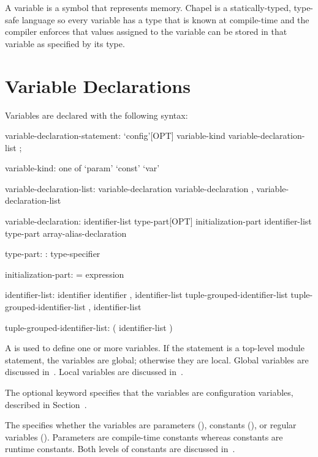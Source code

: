 \label{Variables}

A variable is a symbol that represents memory.  Chapel is a
statically-typed, type-safe language so every variable has a type that
is known at compile-time and the compiler enforces that values
assigned to the variable can be stored in that variable as specified
by its type.

\section{Variable Declarations}
\label{Variable_Declarations}

Variables are declared with the following syntax:
\begin{syntax}
variable-declaration-statement:
  `config'[OPT] variable-kind variable-declaration-list ;

variable-kind: one of
  `param' `const' `var'

variable-declaration-list:
  variable-declaration
  variable-declaration , variable-declaration-list

variable-declaration:
  identifier-list type-part[OPT] initialization-part
  identifier-list type-part
  array-alias-declaration

type-part:
  : type-specifier

initialization-part:
  = expression

identifier-list:
  identifier
  identifier , identifier-list
  tuple-grouped-identifier-list
  tuple-grouped-identifier-list , identifier-list

tuple-grouped-identifier-list:
  ( identifier-list )
\end{syntax}
A  is used to define one or more
variables.  If the statement is a top-level module statement, the
variables are global; otherwise they are local.  Global variables are
discussed in~.  Local variables are discussed
in~.

The optional keyword  specifies that the variables are
configuration variables, described in
Section~.

The  specifies whether the variables are
parameters (), constants (), or regular
variables ().  Parameters are compile-time constants whereas
constants are runtime constants.  Both levels of constants are
discussed in~.

